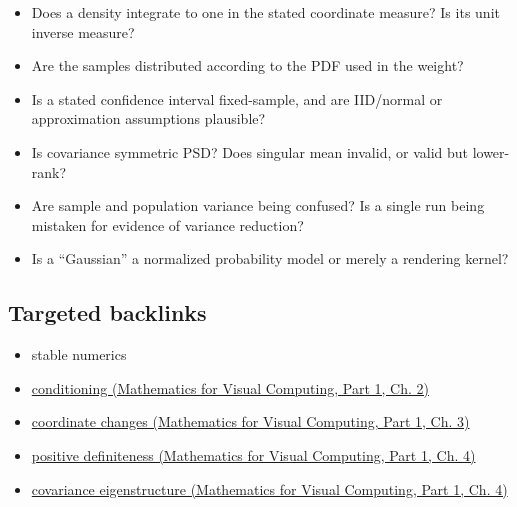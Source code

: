 \hypertarget{appendix-cb5af353ef77-fast-error-checks}{}

\begin{itemize}
\tightlist
\item
  Does a density integrate to one in the stated coordinate measure? Is its unit inverse measure?
\item
  Are the samples distributed according to the PDF used in the weight?
\item
  Is a stated confidence interval fixed-sample, and are IID/normal or approximation assumptions plausible?
\item
  Is covariance symmetric PSD? Does singular mean invalid, or valid but lower-rank?
\item
  Are sample and population variance being confused? Is a single run being mistaken for evidence of variance reduction?
\item
  Is a ``Gaussian'' a normalized probability model or merely a rendering kernel?
\end{itemize}

\subsection{Targeted backlinks}\label{appendix-cb5af353ef77-targeted-backlinks}

\hypertarget{appendix-cb5af353ef77-targeted-backlinks}{}

\begin{itemize}
\tightlist
\item
  {stable numerics}
\item
  \href{../02-Mathematics-for-Visual-Computing-P01/main.pdf\#nameddest=01-foundations-i-ch018-an-inverse-can-exist-and-still-amplify-uncertainty}{conditioning (Mathematics for Visual Computing, Part 1, Ch. 2)}
\item
  \href{../02-Mathematics-for-Visual-Computing-P01/main.pdf\#nameddest=01-foundations-i-ch019-coordinates-can-change-while-the-geometric-object-stays-still}{coordinate changes (Mathematics for Visual Computing, Part 1, Ch. 3)}
\item
  \href{../02-Mathematics-for-Visual-Computing-P01/main.pdf\#nameddest=01-foundations-i-ch020-positive-definiteness-is-a-structural-promise}{positive definiteness (Mathematics for Visual Computing, Part 1, Ch. 4)}
\item
  \href{../02-Mathematics-for-Visual-Computing-P01/main.pdf\#nameddest=01-foundations-i-ch020-diagonalization-leads-to-the-stronger-symmetric-spectral-theorem}{covariance eigenstructure (Mathematics for Visual Computing, Part 1, Ch. 4)}
\end{itemize}

